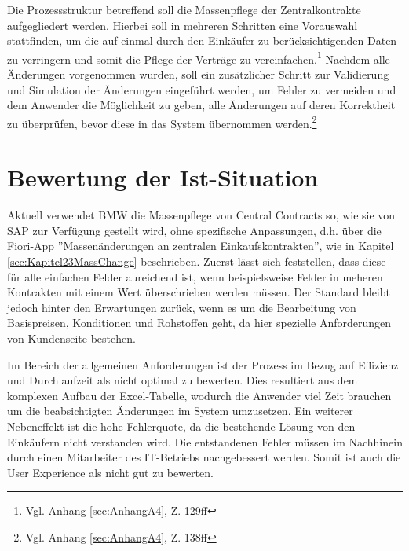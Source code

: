 Die Prozessstruktur betreffend soll die Massenpflege der Zentralkontrakte aufgegliedert werden. Hierbei soll in mehreren Schritten eine Vorauswahl stattfinden, um die auf einmal durch den Einkäufer zu berücksichtigenden Daten zu verringern und somit die Pflege der Verträge zu vereinfachen.\footnote{Vgl. Anhang \ref{sec:AnhangA4}, Z. 129ff} Nachdem alle Änderungen vorgenommen wurden, soll ein zusätzlicher Schritt zur Validierung und Simulation der Änderungen eingeführt werden, um Fehler zu vermeiden und dem Anwender die Möglichkeit zu geben, alle Änderungen auf deren Korrektheit zu überprüfen, bevor diese in das System übernommen werden.\footnote{Vgl. Anhang \ref{sec:AnhangA4}, Z. 138ff}

\section{Bewertung der Ist-Situation}

Aktuell verwendet BMW die Massenpflege von Central Contracts so, wie sie von SAP zur Verfügung gestellt wird, ohne spezifische Anpassungen, d.h. über die Fiori-App ''Massenänderungen an zentralen Einkaufskontrakten'', wie in Kapitel \ref{sec:Kapitel23MassChange} beschrieben. Zuerst lässt sich feststellen, dass diese für alle einfachen Felder aureichend ist, wenn beispielsweise Felder in meheren Kontrakten mit einem Wert überschrieben werden müssen. Der Standard bleibt jedoch hinter den Erwartungen zurück, wenn es um die Bearbeitung von Basispreisen, Konditionen und Rohstoffen geht, da hier spezielle Anforderungen von Kundenseite bestehen.

Im Bereich der allgemeinen Anforderungen ist der Prozess im Bezug auf Effizienz und Durchlaufzeit als nicht optimal zu bewerten. Dies resultiert aus dem komplexen Aufbau der Excel-Tabelle, wodurch die Anwender viel Zeit brauchen um die beabsichtigten Änderungen im System umzusetzen. Ein weiterer Nebeneffekt ist die hohe Fehlerquote, da die bestehende Lösung von den Einkäufern nicht verstanden wird. Die entstandenen Fehler müssen im Nachhinein durch einen Mitarbeiter des IT-Betriebs nachgebessert werden. Somit ist auch die User Experience als nicht gut zu bewerten.


